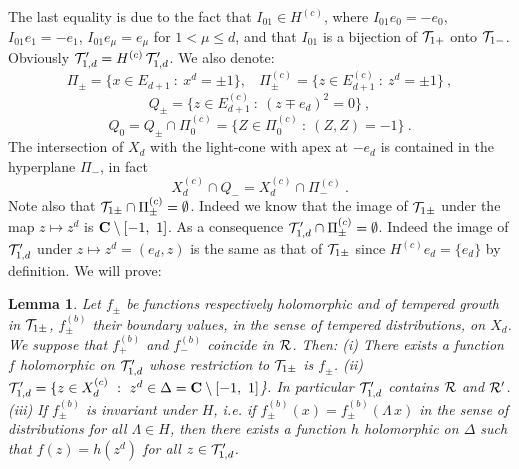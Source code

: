 \documentclass[a4paper,a4paper]{article}
\newtheorem{lemma}{Lemma}[section]
\def\RR{\mathbb R}
\def\bC{{\bf C}}
\def\RR{{\cal R}}
\def\TT{{\cal T}}
\def\HB{\hfill\break}
\def\Xcd{X_d^{(c)}}
\def\amb{E_{d+1}}
\def\ambc{\amb^{(c)}}
\begin{document}
The last equality is due to the fact that $I_{01} \in H^{(c)}$,
where $I_{01}e_0 = -e_0$, $I_{01}e_1 = -e_1$, $I_{01}e_\mu = e_\mu$
for $1< \mu\le d$, and that $I_{01}$ is a bijection of
$\TT_{1+}$ onto $\TT_{1-}$. Obviously $\TT'_{1,d} = H^{(c)}\,\TT'_{1,d}$.
We also denote:
\begin{equation}
\Pi_\pm = \{x\in \amb\ :\ x^d = \pm 1\},\ \ \ \
\Pi^{(c)}_\pm = \{z\in \ambc\ :\ z^d = \pm 1\}\ ,
\label{a2pt.3.1}\end{equation}
\begin{equation}
Q_\pm = \{z\in \ambc\ :\ (z \mp e_d)^2 = 0\}\ ,
\label{a2pt.3.2}\end{equation}
\begin{equation}
Q_0 = Q_\pm \cap \Pi_0^{(c)} =
\{Z \in \Pi_0^{(c)}\ :\ (Z,Z) = -1\}\ .
\label{a2pt.3.3}\end{equation}
The intersection of $X_d$ with the light-cone with apex at $-e_d$
is contained in the hyperplane $\Pi_-$, in fact
\begin{equation}
\Xcd \cap Q_- = \Xcd \cap \Pi_-^{(c)}\ .
\label{a2pt.3.4}\end{equation}
Note also that $\TT_{1\pm}\cap \Pi^{(c)}_\pm = \emptyset$. Indeed we
know that the image of $\TT_{1\pm}$ under the map
$z \mapsto z^d$ is $\bC \setminus [-1,\ 1]$. As a consequence
$\TT'_{1,d} \cap \Pi^{(c)}_\pm = \emptyset$. Indeed the image of
$\TT'_{1,d}$ under $z \mapsto z^d = (e_d,z)$ is the same as that of
$\TT_{1\pm}$ since $H^{(c)}e_d = \{e_d\}$ by definition.
We will prove:

\begin{lemma}
\label{GS}
Let $f_\pm$ be functions respectively holomorphic and of tempered
growth in $\TT_{1\pm}$, $f_\pm^{(b)}$ their boundary values,
in the sense of tempered distributions, on $X_d$. We suppose
that $f_+^{(b)}$ and $f_-^{(b)}$ coincide in $\RR$. Then:\HB
(i) There exists a function
$f$ holomorphic on $\TT'_{1,d}$ whose restriction to
$\TT_{1\pm}$ is $f_\pm$.\HB
(ii) $\TT'_{1,d} =
\{z \in \Xcd\ :\ z^d \in \Delta = \bC \setminus [-1,\ 1]$\}.
In particular $\TT'_{1,d}$ contains $\RR$ and $\RR'$.\HB
(iii) If $f^{(b)}_\pm$ is invariant under $H$, i.e. if
$f^{(b)}_\pm(x) = f^{(b)}_\pm(\Lambda\,x)$ in the sense of
distributions for all $\Lambda \in H$, then there exists
a function $h$ holomorphic on $\Delta$ such that
$f(z) = h(z^d)$ for all $z \in \TT'_{1,d}$.
\end{lemma}
\end{document}
